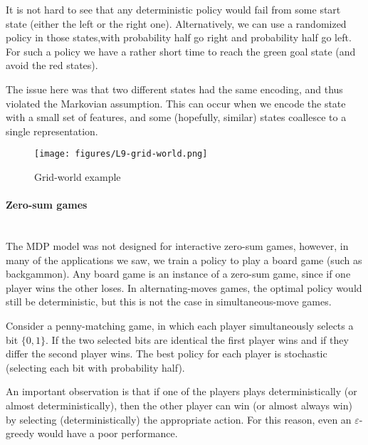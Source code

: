 It is not hard to see that any deterministic policy would fail from
some start state (either the left or the right one). Alternatively,
we can use a randomized policy in those states,with probability half
go right and probability half go left. For such a policy we have a
rather short time to reach the green goal state (and avoid the red
states).

The issue here was that two different states had the same encoding,
and thus violated the Markovian assumption. This can occur when we
encode the state with a small set of features, and some (hopefully,
similar) states coallesce to a single representation.

\begin{figure}
  \begin{centering}
  \texttt{[image: figures/L9-grid-world.png]}\\
  \caption{Grid-world example }\label{fig:L9-grid-world}
  \end{centering}
\end{figure}

\paragraph{Zero-sum games}\ \\
The MDP model was not designed for interactive zero-sum games,
however, in many of the applications we saw, we train a policy to
play a board game (such as backgammon). Any board game is an
instance of a zero-sum game, since if one player wins the other
loses. In alternating-moves games, the optimal policy would still be
deterministic, but this is not the case in simultaneous-move games.


Consider a penny-matching game, in which each player simultaneously
selects a bit $\{0,1\}$. If the two selected bits are identical the
first player wins and if they differ the second player wins. The
best policy for each player is stochastic (selecting each bit with
probability half).

An important observation is that if one of the players plays
deterministically (or almost deterministically), then the other
player can win (or almost always win) by selecting
(deterministically) the appropriate action. For this reason, even
an $\varepsilon$-greedy would have a poor performance.

